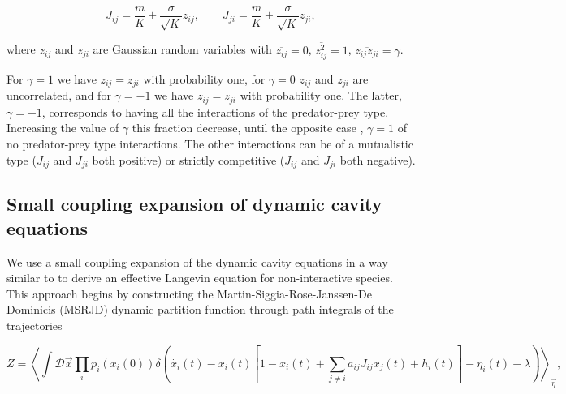 \documentclass[
    preprint,
    linenumbers,
    amsmath,amssymb,amsfonts,
    aps, physrev,
    superscriptaddress,
    10pt,
    bibnotes
    ]{revtex4-2}
\begin{document}
\begin{equation}
J_{ij}=\frac{m}{K}+\frac{\sigma}{\sqrt{K}}z_{ij},\qquad J_{ji}=\frac{m}{K}+\frac{\sigma}{\sqrt{K}}z_{ji},
\end{equation}

where $z_{ij}$ and $z_{ji}$ are Gaussian random variables with $\overline{z_{ij}}=0$,
$\overline{z_{ij}^{2}}=1$, $\overline{z_{ij}z_{ji}}=\gamma$.

For $\gamma=1$ we have $z_{ij}=z_{ji}$ with probability one, for
$\gamma=0$ $z_{ij}$ and $z_{ji}$ are uncorrelated, and for $\gamma=-1$
we have $z_{ij}=z_{ji}$ with probability one. The latter, $\gamma=-1$,
corresponds to having all the interactions of the predator-prey type.
Increasing the value of $\gamma$ this fraction decrease, until the
opposite case , $\gamma=1$ of no predator-prey type interactions.
The other interactions can be of a mutualistic type ($J_{ij}$ and
$J_{ji}$ both positive) or strictly competitive ($J_{ij}$ and $J_{ji}$
both negative).

\subsection{Small coupling expansion of dynamic cavity equations}

We use a small coupling expansion of the dynamic cavity equations in a way similar to \cite{taraboloGaussianApproximationDynamic2025}
to derive an effective Langevin equation for non-interactive species. This approach
begins by constructing the Martin-Siggia-Rose-Janssen-De Dominicis
(MSRJD) dynamic partition function through path integrals of the trajectories
\cite{martinStatisticalDynamicsClassical1973,janssenLagrangeanClassicalField1976,dedominicisDynamicsSubstituteReplicas1978}


\begin{equation}
Z=\left\langle \int\mathcal{D}\vec{x}\prod_{i}p_{i}\left(x_{i}\left(0\right)\right)\delta\left(\dot{x_{i}}(t)-x_{i}(t)\left[1-x_{i}(t)+\sum_{j\neq i}a_{ij}J_{ij}x_{j}(t)+h_{i}(t)\right]-\eta_{i}(t)-\lambda\right)\right\rangle _{\vec{\eta}},
\end{equation}
\end{document}
